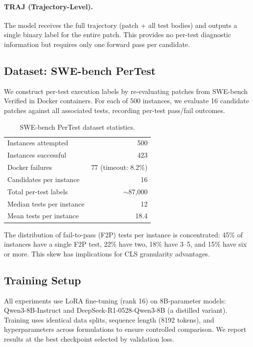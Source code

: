\documentclass[11pt]{article}
\begin{document}
\paragraph{TRAJ (Trajectory-Level).} The model receives the full trajectory (patch + all test bodies) and outputs a single binary label for the entire patch. This provides no per-test diagnostic information but requires only one forward pass per candidate.

\subsection{Dataset: SWE-bench PerTest}

We construct per-test execution labels by re-evaluating patches from SWE-bench Verified in Docker containers. For each of 500 instances, we evaluate 16 candidate patches against all associated tests, recording per-test pass/fail outcomes.

\begin{table}[h]
\centering
\caption{SWE-bench PerTest dataset statistics.}
\label{tab:dataset}
\begin{tabular}{lr}
\toprule
Instances attempted & 500 \\
Instances successful & 423 \\
Docker failures & 77 (timeout: 8.2\%) \\
Candidates per instance & 16 \\
Total per-test labels & $\sim$87,000 \\
Median tests per instance & 12 \\
Mean tests per instance & 18.4 \\
\bottomrule
\end{tabular}
\end{table}

The distribution of fail-to-pass (F2P) tests per instance is concentrated: 45\% of instances have a single F2P test, 22\% have two, 18\% have 3--5, and 15\% have six or more. This skew has implications for CLS granularity advantages.

\subsection{Training Setup}

All experiments use LoRA fine-tuning (rank 16) on 8B-parameter models: Qwen3-8B-Instruct and DeepSeek-R1-0528-Qwen3-8B (a distilled variant). Training uses identical data splits, sequence length (8192 tokens), and hyperparameters across formulations to ensure controlled comparison. We report results at the best checkpoint selected by validation loss.
\end{document}
